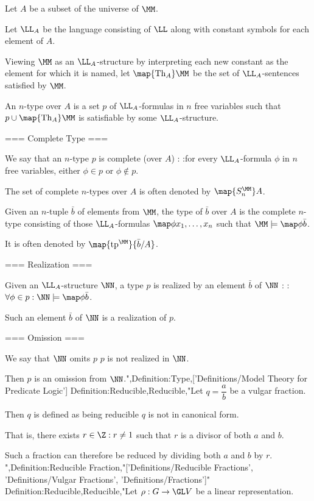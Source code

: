 Let $A$ be a subset of the universe of $\MM$.

Let $\LL_A$ be the language consisting of $\LL$ along with constant symbols for each element of $A$.

Viewing $\MM$ as an $\LL_A$-structure by interpreting each new constant as the element for which it is named, let $\map {\operatorname {Th}_A} \MM$ be the set of $\LL_A$-sentences satisfied by $\MM$.


An $n$-type over $A$ is a set $p$ of $\LL_A$-formulas in $n$ free variables such that $p \cup \map {\operatorname {Th}_A} \MM$ is satisfiable by some $\LL_A$-structure.




=== Complete Type ===

We say that an $n$-type $p$ is complete (over $A$) :
:for every $\LL_A$-formula $\phi$ in $n$ free variables, either $\phi \in p$ or $\phi \notin p$.


The set of complete $n$-types over $A$ is often denoted by $\map {S_n^\MM} A$.


Given an $n$-tuple $\bar b$ of elements from $\MM$, the type of $\bar b$ over $A$ is the complete $n$-type consisting of those $\LL_A$-formulas $\map \phi {x_1, \dotsc, x_n}$ such that $\MM \models \map \phi {\bar b}$.

It is often denoted by $\map {\operatorname {tp}^\MM} {\bar b / A}$.


=== Realization ===

Given an $\LL_A$-structure $\NN$, a type $p$ is realized by an element $\bar b$ of $\NN$ :
:$\forall \phi \in p: \NN \models \map \phi {\bar b}$.

Such an element $\bar b$ of $\NN$ is a realization of $p$.


=== Omission ===

We say that $\NN$ omits $p$  $p$ is not realized in $\NN$.

Then $p$ is an omission from $\NN$.",Definition:Type,['Definitions/Model Theory for Predicate Logic']
Definition:Reducible,Reducible,"Let $q = \dfrac a b$ be a vulgar fraction.

Then $q$ is defined as being reducible  $q$ is not in canonical form.

That is,  there exists $r \in \Z: r \ne 1$ such that $r$ is a divisor of both $a$ and $b$.

Such a fraction can therefore be reduced by dividing both $a$ and $b$ by $r$.
",Definition:Reducible Fraction,"['Definitions/Reducible Fractions', 'Definitions/Vulgar Fractions', 'Definitions/Fractions']"
Definition:Reducible,Reducible,"Let $\rho: G \to \GL V$ be a linear representation.


